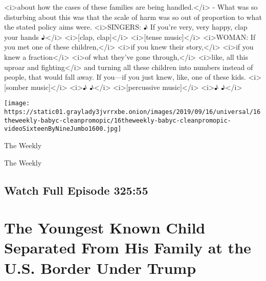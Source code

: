 \begin{itemize}
\begin{itemize}
    \textless{}i\textgreater{}about how the cases of these families are
    being handled.\textless{}/i\textgreater{} - What was so disturbing
    about this was that the scale of harm was so out of proportion to
    what the stated policy aims were. \textless{}i\textgreater{}SINGERS:
    ♪ If you're very, very happy, clap your hands
    ♪\textless{}/i\textgreater{} \textless{}i\textgreater{}{[}clap,
    clap{]}\textless{}/i\textgreater{}
    \textless{}i\textgreater{}{[}tense
    music{]}\textless{}/i\textgreater{} \textless{}i\textgreater{}WOMAN:
    If you met one of these children,\textless{}/i\textgreater{}
    \textless{}i\textgreater{}if you knew their
    story,\textless{}/i\textgreater{} \textless{}i\textgreater{}if you
    knew a fraction\textless{}/i\textgreater{}
    \textless{}i\textgreater{}of what they've gone
    through,\textless{}/i\textgreater{} \textless{}i\textgreater{}like,
    all this uproar and fighting\textless{}/i\textgreater{} and turning
    all these children into numbers instead of people, that would fall
    away. If you---if you just knew, like, one of these kids.
    \textless{}i\textgreater{}{[}somber
    music{]}\textless{}/i\textgreater{} \textless{}i\textgreater{}♪
    ♪\textless{}/i\textgreater{} \textless{}i\textgreater{}{[}percussive
    music{]}\textless{}/i\textgreater{} \textless{}i\textgreater{}♪
    ♪\textless{}/i\textgreater{}
  \end{itemize}
\end{itemize}

\texttt{[image: https://static01.graylady3jvrrxbe.onion/images/2019/09/16/universal/16theweekly-babyc-cleanpromopic/16theweekly-babyc-cleanpromopic-videoSixteenByNineJumbo1600.jpg]}

The Weekly

The Weekly

\hypertarget{watch-full-episode-32555}{%
\subsection{Watch Full Episode 325:55}\label{watch-full-episode-32555}}

\hypertarget{the-youngest-known-child-separated-from-his-family-at-the-us-border-under-trump-}{%
\section{The Youngest Known Child Separated From His Family at the U.S.
Border Under Trump
}\label{the-youngest-known-child-separated-from-his-family-at-the-us-border-under-trump-}}

